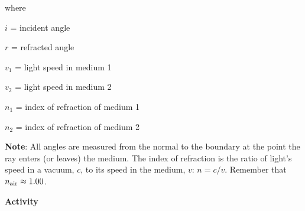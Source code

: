 where

\begin{description}[labelindent=0.2in, nosep]
\item $i$ = incident angle

\item $r$ = refracted angle

\item $v_{1}$ = light speed in medium 1

\item \(v_{2} \) = light speed in medium 2

\item \(n_{1} \) = index of refraction of medium 1 

\item \(n_{2} \) = index of refraction of medium 2
\end{description}

\textbf{Note}: All angles are measured from the normal to the boundary
at the point the ray enters (or leaves) the medium. The index of refraction is
the ratio of light's speed in a vacuum, $c$, to its speed in the medium,
$v$: $n = c / v$. Remember that $n_{\rm air} \approx 1.00$.




\bigskip
\textbf{Activity} 

